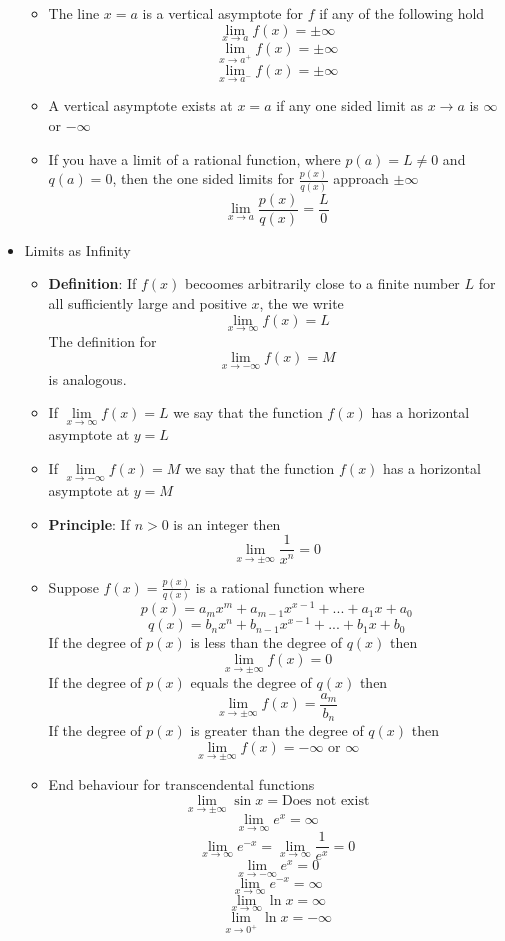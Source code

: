 \documentclass{article}
\begin{document}
\begin{itemize}
\begin{itemize}
		\item The line $x = a$ is a vertical asymptote for $f$ if any of the following hold
		$$\lim_{x \to a}{f(x)} = \pm \infty$$
		$$\lim_{x \to a^+}{f(x)} = \pm \infty$$
		$$\lim_{x \to a^-}{f(x)} = \pm \infty$$
		\item A vertical asymptote exists at $x = a$ if any one sided limit as $x \to a$ is $\infty$ or $- \infty$
		\item If you have a limit of a rational function, where $p(a) = L \neq 0$ and $q(a) = 0$, then the one sided limits for $\frac{p(x)}{q(x)}$ approach $\pm \infty$
		$$\lim_{x \to a}{\frac{p(x)}{q(x)}} = \frac{L}{0}$$
	\end{itemize}
	\item Limits as Infinity
	\begin{itemize}
		\item \textbf{Definition}: If $f(x)$ becoomes arbitrarily close to a finite number $L$ for all sufficiently large and positive $x$, the we write
		$$\lim_{x \to \infty}{f(x)} = L$$
		The definition for
		$$\lim_{x \to - \infty}{f(x)} = M$$
		is analogous.
		\item If $\lim\limits_{x \to \infty}{f(x)} = L$ we say that the function $f(x)$ has a horizontal asymptote at $y = L$
		\item If $\lim\limits_{x \to - \infty}{f(x)} = M$ we say that the function $f(x)$ has a horizontal asymptote at $y = M$
		\item \textbf{Principle}: If $n > 0$ is an integer then
		$$\lim_{x \to \pm \infty}{\frac{1}{x^n}} = 0$$
		\item Suppose $f(x) = \frac{p(x)}{q(x)}$ is a rational function where
		$$p(x) = a_mx^m + a_{m-1}x^{x-1} + ... + a_1x + a_0$$
		$$q(x) = b_nx^n + b_{n-1}x^{x-1} + ... + b_1x + b_0$$
		If the degree of $p(x)$ is less than the degree of $q(x)$ then
		$$\lim_{x \to \pm \infty}{f(x)} = 0$$
		If the degree of $p(x)$ equals the degree of $q(x)$ then
		$$\lim_{x \to \pm \infty}{f(x)} = \frac{a_m}{b_n}$$
		If the degree of $p(x)$ is greater than the degree of $q(x)$ then
		$$\lim_{x \to \pm \infty}{f(x)} = - \infty \text{ or } \infty$$
		\item End behaviour for transcendental functions
		$$\lim_{x \to \pm \infty}{\sin{x}} = \text{Does not exist}$$
		$$\lim_{x \to \infty}{e^x} = \infty$$
		$$\lim_{x \to \infty}{e^{-x}} = \lim_{x \to \infty}{\frac{1}{e^{x}}} = 0$$
		$$\lim_{x \to - \infty}{e^x} = 0$$
		$$\lim_{x \to \infty}{e^{-x}} = \infty$$
		$$\lim_{x \to \infty}{\ln{x}} = \infty$$
		$$\lim_{x \to 0^+}{\ln{x}} = - \infty$$
	\end{itemize}
\end{itemize}
\end{document}
